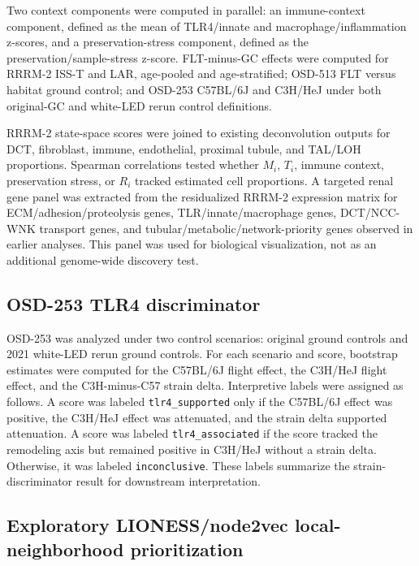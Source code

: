\documentclass[11pt]{article}
\newcommand{\code}[1]{\texttt{#1}}
\begin{document}
Two context components were computed in parallel: an immune-context component, defined as the mean of TLR4/innate and macrophage/inflammation z-scores, and a preservation-stress component, defined as the preservation/sample-stress z-score. FLT-minus-GC effects were computed for RRRM-2 ISS-T and LAR, age-pooled and age-stratified; OSD-513 FLT versus habitat ground control; and OSD-253 C57BL/6J and C3H/HeJ under both original-GC and white-LED rerun control definitions.

RRRM-2 state-space scores were joined to existing deconvolution outputs for DCT, fibroblast, immune, endothelial, proximal tubule, and TAL/LOH proportions. Spearman correlations tested whether $M_i$, $T_i$, immune context, preservation stress, or $R_i$ tracked estimated cell proportions. A targeted renal gene panel was extracted from the residualized RRRM-2 expression matrix for ECM/adhesion/proteolysis genes, TLR/innate/macrophage genes, DCT/NCC-WNK transport genes, and tubular/metabolic/network-priority genes observed in earlier analyses. This panel was used for biological visualization, not as an additional genome-wide discovery test.

\subsection{OSD-253 TLR4 discriminator}

OSD-253 was analyzed under two control scenarios: original ground controls and 2021 white-LED rerun ground controls. For each scenario and score, bootstrap estimates were computed for the C57BL/6J flight effect, the C3H/HeJ flight effect, and the C3H-minus-C57 strain delta. Interpretive labels were assigned as follows. A score was labeled \code{tlr4\_supported} only if the C57BL/6J effect was positive, the C3H/HeJ effect was attenuated, and the strain delta supported attenuation. A score was labeled \code{tlr4\_associated} if the score tracked the remodeling axis but remained positive in C3H/HeJ without a strain delta. Otherwise, it was labeled \code{inconclusive}. These labels summarize the strain-discriminator result for downstream interpretation.

\subsection{Exploratory LIONESS/node2vec local-neighborhood prioritization}
\end{document}
